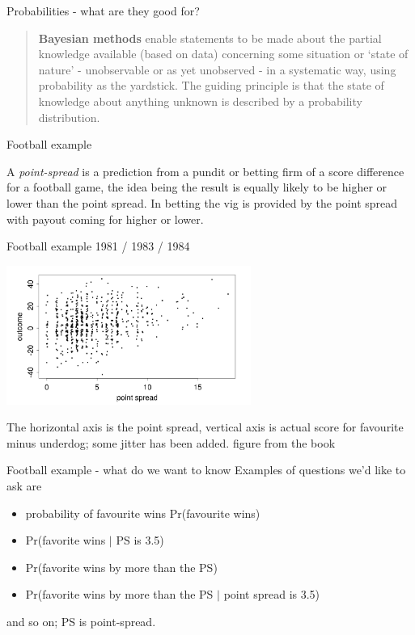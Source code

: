 \documentclass{beamer}
\newcommand{\coblu}{\color{blue}{}}
\newcommand{\cor}{\color{reddish}{}}
\newcommand{\cob}{\color{black}{}}
\begin{document}
\begin{frame}{Probabilities - what are they good for?}
\begin{quote}
\textbf{Bayesian methods} enable statements to be made about the
partial knowledge available (based on data) concerning some situation
or `state of nature' - unobservable or as yet unobserved - in a
systematic way, using probability as the yardstick. The guiding
principle is that the state of knowledge about anything unknown is
described by a probability distribution.
\end{quote}
\end{frame}

\begin{frame}{Football example}

  A \textsl{point-spread} is a prediction from a pundit or betting
  firm of a score difference for a football game, the idea being the
  result is equally likely to be higher or lower than the point
  spread. In betting the vig is provided by the point spread with
  payout coming for higher or lower.

\end{frame}


\begin{frame}{Football example 1981 / 1983 / 1984}

\begin{center}
    \includegraphics[width=8cm]{football_results.png}
\end{center}

The \coblu{}horizontal axis\cob{} is the point spread, \coblu{}vertical axis\cob{} is actual score for favourite minus underdog; some jitter has been added.
\vfill
\color{gray}figure from the book\cob

\end{frame}

\begin{frame}{Football example - what do we want to know}
  Examples of questions we'd like to ask are
\vskip 0.75cm
  \begin{itemize}
  \item probability of favourite wins \cor{}Pr(favourite wins)\cob
  \item \cor{}Pr(favorite wins $|$ PS is 3.5)\cob
  \item \cor{}Pr(favorite wins by more than the PS)\cob
  \item \cor{}Pr(favorite wins by more than the PS $|$ point spread is 3.5)\cob
  \end{itemize}
  \vskip 0.75cm
  and so on; PS is point-spread.
\end{frame}
\end{document}
